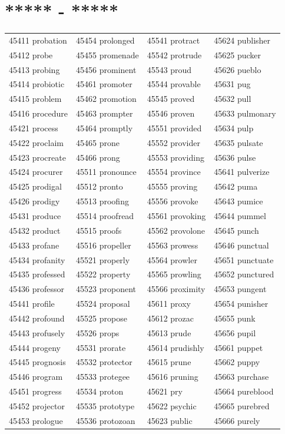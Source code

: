 \documentclass[10pt, oneside]{book}
\begin{document}
\begin{table}[h]
	\centering
	\section*{***** - *****}
	\begin{tabular}{l l l l}
45411 probation &45454 prolonged &45541 protract &45624 publisher\\
45412 probe &45455 promenade &45542 protrude &45625 pucker\\
45413 probing &45456 prominent &45543 proud &45626 pueblo\\
45414 probiotic &45461 promoter &45544 provable &45631 pug\\
45415 problem &45462 promotion &45545 proved &45632 pull\\
45416 procedure &45463 prompter &45546 proven &45633 pulmonary\\
45421 process &45464 promptly &45551 provided &45634 pulp\\
45422 proclaim &45465 prone &45552 provider &45635 pulsate\\
45423 procreate &45466 prong &45553 providing &45636 pulse\\
45424 procurer &45511 pronounce &45554 province &45641 pulverize\\
45425 prodigal &45512 pronto &45555 proving &45642 puma\\
45426 prodigy &45513 proofing &45556 provoke &45643 pumice\\
45431 produce &45514 proofread &45561 provoking &45644 pummel\\
45432 product &45515 proofs &45562 provolone &45645 punch\\
45433 profane &45516 propeller &45563 prowess &45646 punctual\\
45434 profanity &45521 properly &45564 prowler &45651 punctuate\\
45435 professed &45522 property &45565 prowling &45652 punctured\\
45436 professor &45523 proponent &45566 proximity &45653 pungent\\
45441 profile &45524 proposal &45611 proxy &45654 punisher\\
45442 profound &45525 propose &45612 prozac &45655 punk\\
45443 profusely &45526 props &45613 prude &45656 pupil\\
45444 progeny &45531 prorate &45614 prudishly &45661 puppet\\
45445 prognosis &45532 protector &45615 prune &45662 puppy\\
45446 program &45533 protegee &45616 pruning &45663 purchase\\
45451 progress &45534 proton &45621 pry &45664 pureblood\\
45452 projector &45535 prototype &45622 psychic &45665 purebred\\
45453 prologue &45536 protozoan &45623 public &45666 purely\\
	\end{tabular}
 \end{table}
\end{document}
